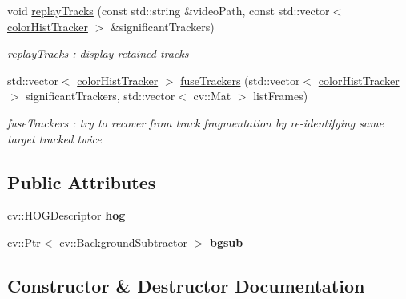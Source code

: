 \begin{DoxyCompactItemize}
void \hyperlink{classBgsubTrack_a113fe838622ac8879f3e1dba9a1e44b9}{replay\+Tracks} (const std\+::string \&video\+Path, const std\+::vector$<$ \hyperlink{structcolorHistTracker}{color\+Hist\+Tracker} $>$ \&significant\+Trackers)
\begin{DoxyCompactList}\small\item\em replay\+Tracks \+: display retained tracks \end{DoxyCompactList}\item 
std\+::vector$<$ \hyperlink{structcolorHistTracker}{color\+Hist\+Tracker} $>$ \hyperlink{classBgsubTrack_aa1e976c084ebf6541cbe71136e76d7cd}{fuse\+Trackers} (std\+::vector$<$ \hyperlink{structcolorHistTracker}{color\+Hist\+Tracker} $>$ significant\+Trackers, std\+::vector$<$ cv\+::\+Mat $>$ list\+Frames)
\begin{DoxyCompactList}\small\item\em fuse\+Trackers \+: try to recover from track fragmentation by re-\/identifying same target tracked twice \end{DoxyCompactList}\end{DoxyCompactItemize}
\subsection*{Public Attributes}
\begin{DoxyCompactItemize}
\item 
cv\+::\+H\+O\+G\+Descriptor {\bfseries hog}\hypertarget{classBgsubTrack_a04b684b7ae733215a4117c90219c08fb}{}\label{classBgsubTrack_a04b684b7ae733215a4117c90219c08fb}

\item 
cv\+::\+Ptr$<$ cv\+::\+Background\+Subtractor $>$ {\bfseries bgsub}\hypertarget{classBgsubTrack_ad5f0f9d665d4636b6d672905f705c875}{}\label{classBgsubTrack_ad5f0f9d665d4636b6d672905f705c875}

\end{DoxyCompactItemize}


\subsection{Constructor \& Destructor Documentation}
